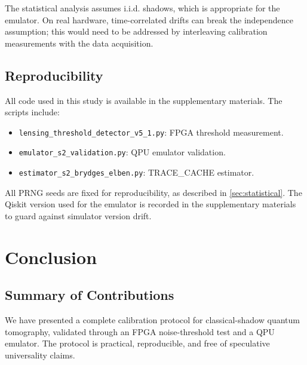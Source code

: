 \documentclass[12pt,a4paper,oneside]{book}
\theoremstyle{plain}
\theoremstyle{definition}
\theoremstyle{remark}
\begin{document}
The statistical analysis assumes i.i.d. shadows, which is appropriate for the emulator. On real hardware, time-correlated drifts can break the independence assumption; this would need to be addressed by interleaving calibration measurements with the data acquisition.

\section{Reproducibility}
\label{sec:disc_reproducibility}

All code used in this study is available in the supplementary materials. The scripts include:
\begin{itemize}[itemsep=2pt]
    \item \texttt{lensing\_threshold\_detector\_v5\_1.py}: FPGA threshold measurement.
    \item \texttt{emulator\_s2\_validation.py}: QPU emulator validation.
    \item \texttt{estimator\_s2\_brydges\_elben.py}: TRACE\_CACHE estimator.
\end{itemize}

All PRNG seeds are fixed for reproducibility, as described in \cref{sec:statistical}. The Qiskit version used for the emulator is recorded in the supplementary materials to guard against simulator version drift.

\chapter{Conclusion}
\label{chap:conclusion}

\section{Summary of Contributions}
\label{sec:conc_summary}

We have presented a complete calibration protocol for classical-shadow quantum tomography, validated through an FPGA noise-threshold test and a QPU emulator. The protocol is practical, reproducible, and free of speculative universality claims.
\end{document}
